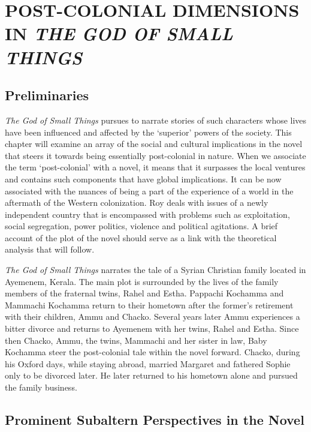\chapter{POST-COLONIAL DIMENSIONS IN \emph{THE GOD OF SMALL THINGS}}

\section{Preliminaries}

\emph{The God of Small Things} pursues to narrate stories of such characters whose lives have been influenced and affected by the `superior' powers of the society. This chapter will examine an array of the social and cultural implications in the novel that steers it towards being essentially post-colonial in nature. When we associate the term ‘post-colonial’ with a novel, it means that it surpasses the local ventures and contains such components that have global implications. It can be now associated with the nuances of being a part of the experience of a world in the aftermath of the Western colonization. Roy deals with issues of a newly independent country that is encompassed with problems such as exploitation, social segregation, power politics, violence and political agitations. A brief account of the plot of the novel should serve as a link with the theoretical analysis that will follow. 

\emph{The God of Small Things} narrates the tale of a Syrian Christian family located in Ayemenem, Kerala. The main plot is surrounded by the lives of the family members of the fraternal twins, Rahel and Estha. Pappachi Kochamma and Mammachi Kochamma return to their hometown after the former’s retirement with their children, Ammu and Chacko. Several years later Ammu experiences a bitter divorce and returns to Ayemenem with her twins, Rahel and Estha. Since then Chacko, Ammu, the twins, Mammachi and her sister in law, Baby Kochamma steer the post-colonial tale within the novel forward. Chacko, during his Oxford days, while staying abroad, married Margaret and fathered Sophie only to be divorced later. He later returned to his hometown alone and pursued the family business. 

\section{Prominent Subaltern Perspectives in the Novel}

